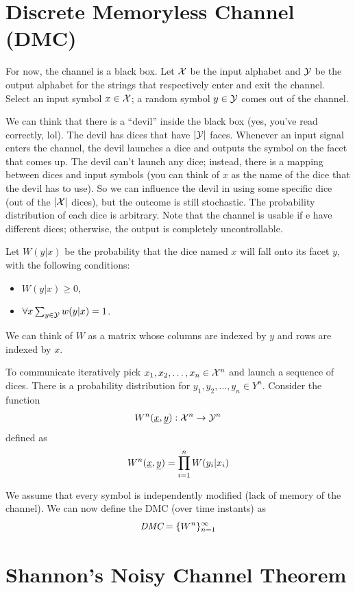 
\section{Discrete Memoryless Channel (DMC)}

For now, the channel is a black box. Let $\mathcal{X}$ be the input alphabet and $\mathcal{Y}$ be the output alphabet for the strings that respectively enter and exit the channel. Select an input symbol $x \in \mathcal{X}$; a random symbol $y \in \mathcal{Y}$ comes out of the channel.

We can think that there is a ``devil'' inside the black box (yes, you've read correctly, lol). The devil has dices that have $|\mathcal{Y}|$ faces. Whenever an input signal enters the channel, the devil launches a dice and outputs the symbol on the facet that comes up. The devil can't launch any dice; instead, there is a mapping between dices and input symbols (you can think of $x$ as the name of the dice that the devil has to use). So we can influence the devil in using some specific dice (out of the $|\mathcal{X}|$ dices), but the outcome is still stochastic. The probability distribution of each dice is arbitrary. Note that the channel is usable if e have different dices; otherwise, the output is completely uncontrollable.


Let $W(y|x)$ be the probability that the dice named $x$ will fall onto its facet $y$, with the following conditions: 
\begin{itemize}
	\item 
	$W(y|x) \geq 0$,
	\item $\forall x \sum_{y \in \mathcal{Y}} w(y|x) = 1$.
\end{itemize}

We can think of $W$ as a matrix whose columns are indexed by $y$ and rows are indexed by $x$.

To communicate iteratively pick $x_1,x_2, \ldots, x_n \in \mathcal{X}^n$ and launch a sequence of dices. There is a probability distribution for $y_1, y_2, \ldots, y_n \in Y^n$. Consider the function
\[
W^n(\underline{x}, \underline{y}): \mathcal{X}^n \rightarrow \mathcal{Y}^n
\]
defined as
\[
W^n(\underline{x}, \underline{y}) = \prod_{i = 1}^n W(y_i | x_i)
\]

We assume that every symbol is independently modified (lack of memory of the channel). We can now define the DMC (over time instants) as
\[
\emph{DMC} = \{W^n\}_{n = 1}^\infty
\]

\section{Shannon's Noisy Channel Theorem}

